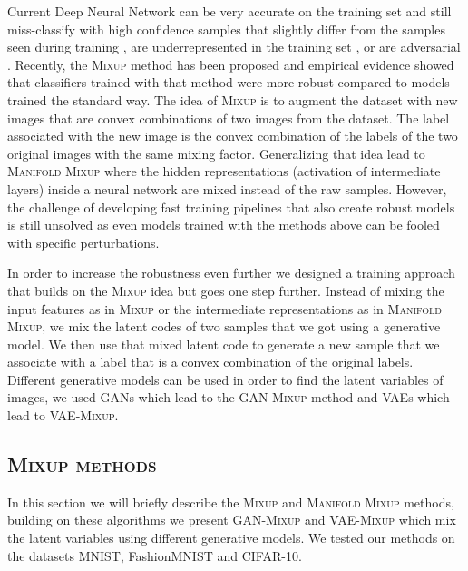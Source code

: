 \documentclass[nohyperref]{article}
\theoremstyle{plain}
\theoremstyle{definition}
\theoremstyle{remark}
\begin{document}
Current Deep Neural Network can be very accurate on the training set and still miss-classify with high confidence samples that slightly differ from the samples seen during training \cite{ben2010theory}, are underrepresented in the training set \cite{dro-hashimoto}, or are adversarial \cite{adv-szegedy}. Recently, the \textsc{Mixup} method has been proposed \cite{mixup1} and empirical evidence showed that classifiers trained with that method were more robust compared to models trained the standard way. The idea of \textsc{Mixup} is to augment the dataset with new images that are convex combinations of two images from the dataset. The label associated with the new image is the convex combination of the labels of the two original images with the same mixing factor. Generalizing that idea lead to \textsc{Manifold Mixup} where the hidden representations (activation of intermediate layers) inside a neural network are mixed instead of the raw samples. However, the challenge of developing fast training pipelines that also create robust models is still unsolved as even models trained with the methods above can be fooled with specific perturbations.

In order to increase the robustness even further we designed a training approach that builds on the \textsc{Mixup} idea but goes one step further. Instead of mixing the input features as in \textsc{Mixup} or the intermediate representations as in \textsc{Manifold Mixup}, we mix the latent codes of two samples that we got using a generative model. We then use that mixed latent code to generate a new sample that we associate with a label that is a convex combination of the original labels. Different generative models can be used in order to find the latent variables of images, we used GANs \cite{gan} which lead to the \textsc{GAN-Mixup} method and VAEs \cite{VAE} which lead to \textsc{VAE-Mixup}.

\subsection{\textsc{Mixup methods}}
In this section we will briefly describe the \textsc{Mixup} and \textsc{Manifold Mixup} methods, building on these algorithms we present \textsc{GAN-Mixup} and \textsc{VAE-Mixup} which mix the latent variables using different generative models. We tested our methods on the datasets MNIST, FashionMNIST and CIFAR-10.
\end{document}
